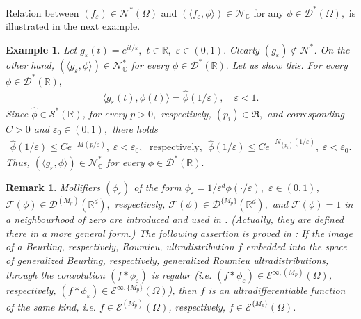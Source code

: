 \documentclass[sn-mathphys,Numbered]{sn-jnl}%
\theoremstyle{thmstyleone}%
\theoremstyle{thmstyletwo}%
\newtheorem{example}{Example}%
\newtheorem{remark}{Remark}%
\theoremstyle{thmstylethree}%
\begin{document}
Relation between  $(f_\varepsilon)\in\mathcal N^*(\Omega)$ and $(\langle f_\varepsilon,\phi\rangle)\in\mathcal N_{\mathbb C}$ for any $\phi\in\mathcal D^*(\Omega),$ is illustrated in the next example.
\begin{example}\label{e1} Let $g_\varepsilon(t)=e^{it/\varepsilon},$ $t\in \mathbb{R},$ $\varepsilon\in (0,1).$ Clearly $(g_\varepsilon)\notin \mathcal{N}^*$. On the other hand, $(\langle g_\varepsilon,\phi\rangle)\in \mathcal{N}^*_\mathbb{C}$ for every $\phi\in\mathcal D^*(\mathbb R).$ 
Let us show this. For every
$\phi\in\mathcal D^*(\mathbb R),$
\begin{align*}
\langle g_\varepsilon(t),\phi(t)\rangle=\hat\phi(1/\varepsilon),\quad\varepsilon<1.
\end{align*}
Since $ \hat\phi\in \mathcal{S}^*(\mathbb R)$, for every $p>0,$ respectively, $(p_i)\in \mathfrak{R},$ and corresponding $C>0$  and $\varepsilon_0\in(0,1),$ there holds
\begin{align*}
\hat\phi(1/\varepsilon)\leq Ce^{-M(p/\varepsilon)},\;\varepsilon<\varepsilon_0,\;\text{ respectively, }\;\hat\phi(1/\varepsilon)\leq Ce^{-N_{(p_i)}(1/\varepsilon)},\;\varepsilon<\varepsilon_0.
\end{align*}
Thus,  $(\langle g_\varepsilon,\phi\rangle)\in \mathcal{N}^*_\mathbb{C}$ for every $\phi\in\mathcal D^*(\mathbb R).$ 
\end{example}


\begin{remark}\label{r*} 
 Mollifiers $(\phi_\varepsilon)$  of the form $\phi_\varepsilon=1/\varepsilon^d \phi(\cdot/\varepsilon), $ $\varepsilon\in(0,1)$,   $\mathcal F(\phi)\in \mathcal{D}^{(M_p)}(\mathbb{R}^d),$ respectively,  $\mathcal F(\phi)\in \mathcal{D}^{\{M_p\}}(\mathbb{R}^d),$  and $\mathcal{F}(\phi)=1$ in a neighbourhood of zero are introduced and used in \cite{D.V.1}. (Actually, they are defined there in a more general form.) The following assertion is proved in \cite{D.V.1}: If  the image of a Beurling, respectively, Roumieu,  ultradistribution $f$  embedded  into the space of generalized Beurling, respectively, generalized Roumieu ultradistributions, through the convolution $(f*\phi_\varepsilon)$
is regular (i.e.  $(f*\phi_\varepsilon)\in\mathcal{E}^{\infty,(M_p)}(\Omega)$, respectively, $(f*\phi_\varepsilon)\in\mathcal{E}^{\infty,\{M_p\}}(\Omega)$), then $f$ is an ultradifferentiable function of the same kind,  i.e.   $f\in\mathcal E^{(M_p)}(\Omega)$, respectively, $f\in\mathcal E^{\{M_p\}}(\Omega)$.
\end{remark}
\end{document}
